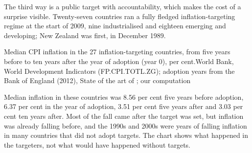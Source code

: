 The third way is a public target with accountability, which makes the cost of a surprise visible.
Twenty-seven countries ran a fully fledged inflation-targeting regime at the start of 2009, nine industrialised and eighteen
emerging and developing; New Zealand was first, in December 1989.

\begin{omchart}{Median CPI inflation in the 27 inflation-targeting countries, from five years before to ten years after the
  year of adoption (year 0), per cent.}{World Bank, World Development Indicators (FP.CPI.TOTL.ZG); adoption years from the
  Bank of England (2012), State of the art of ; our computation}
\end{omchart}

Median inflation in these countries was 8.56 per cent five years before adoption, 6.37 per cent in the year of adoption,
3.51 per cent five years after and 3.03 per cent ten years after. Most of the fall came after the target was set, but
inflation was already falling before, and the 1990s and 2000s were years of falling inflation in many countries that did
not adopt targets. The chart shows what happened in the targeters, not what would have happened without targets.

